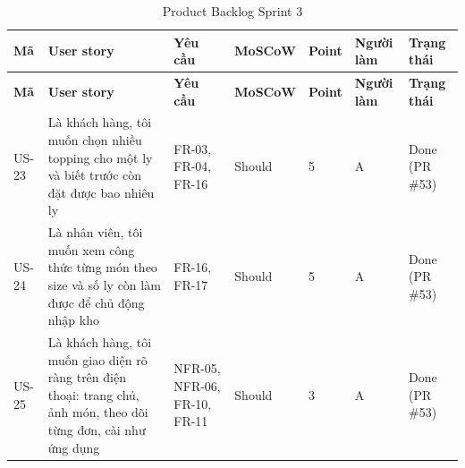{\footnotesize
\begin{longtable}{@{}L{1.1cm}L{4.3cm}L{1.7cm}L{1.6cm}L{0.9cm}L{1.7cm}L{2.6cm}@{}}
\caption{Product Backlog Sprint 3}\label{tab:backlogs3}\\
\toprule
\textbf{Mã} & \textbf{User story} & \textbf{Yêu cầu} & \textbf{MoSCoW} & \textbf{Point} & \textbf{Người làm} & \textbf{Trạng thái} \\ \midrule \endfirsthead
\toprule \textbf{Mã} & \textbf{User story} & \textbf{Yêu cầu} & \textbf{MoSCoW} & \textbf{Point} & \textbf{Người làm} & \textbf{Trạng thái} \\ \midrule \endhead
\bottomrule \endfoot
US-23 & Là khách hàng, tôi muốn chọn nhiều topping cho một ly và biết trước còn đặt được bao nhiêu ly & FR-03, FR-04, FR-16 & Should & 5 & A & Done (PR \#53) \\
US-24 & Là nhân viên, tôi muốn xem công thức từng món theo size và số ly còn làm được để chủ động nhập kho & FR-16, FR-17 & Should & 5 & A & Done (PR \#53) \\
US-25 & Là khách hàng, tôi muốn giao diện rõ ràng trên điện thoại: trang chủ, ảnh món, theo dõi từng đơn, cài như ứng dụng & NFR-05, NFR-06, FR-10, FR-11 & Should & 3 & A & Done (PR \#53) \\
\end{longtable}
}